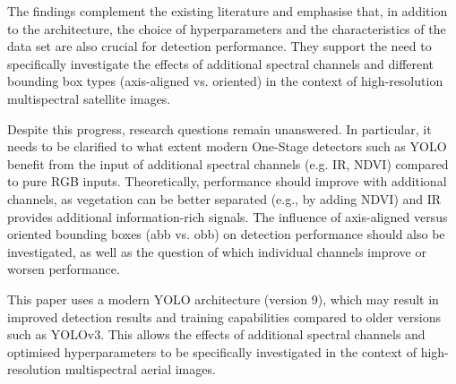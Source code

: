 The findings complement the existing literature and emphasise that, in addition to the architecture, the choice of hyperparameters and the characteristics of the data set are also crucial for detection performance. They support the need to specifically investigate the effects of additional spectral channels and different bounding box types (axis-aligned vs. oriented) in the context of high-resolution multispectral satellite images.

Despite this progress, research questions remain unanswered. In particular, it needs to be clarified to what extent modern One-Stage detectors such as \acrshort{YOLO} benefit from the input of additional spectral channels (e.g. \Acrfull{IR}, \acrshort{NDVI}) compared to pure \acrshort{RGB} inputs. Theoretically, performance should improve with additional channels, as vegetation can be better separated (e.g., by adding \acrshort{NDVI}) and \acrshort{IR} provides additional information-rich signals. The influence of axis-aligned versus oriented bounding boxes (\acrshort{abb} vs. \acrshort{obb}) on detection performance should also be investigated, as well as the question of which individual channels improve or worsen performance.
  
This paper uses a modern \acrshort{YOLO} architecture (version 9), which may result in improved detection results and training capabilities compared to older versions such as YOLOv3. This allows the effects of additional spectral channels and optimised hyperparameters to be specifically investigated in the context of high-resolution multispectral aerial images.



